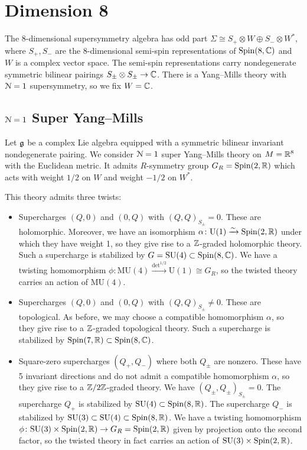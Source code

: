 \documentclass[10pt, oneside]{article}
\newcommand{\MU}{\mathrm{MU}}
\renewcommand{\U}{\mathrm{U}}
\begin{document}
\section{Dimension 8}

The 8-dimensional supersymmetry algebra has odd part $\Sigma\cong S_+\otimes W\oplus S_-\otimes W^*$, where $S_+, S_-$ are the 8-dimensional semi-spin representations of $\mathrm{Spin}(8, \mathbb C)$ and $W$ is a complex vector space. The semi-spin representations carry nondegenerate symmetric bilinear pairings $S_{\pm}\otimes S_{\pm}\rightarrow \mathbb C$. There is a Yang--Mills theory with $\mathcal{N}=1$ supersymmetry, so we fix $W = \mathbb C$.

\subsection{\texorpdfstring{$\mathcal N=1$}{N=1} Super Yang--Mills}

Let $\mathfrak g$ be a complex Lie algebra equipped with a symmetric bilinear invariant nondegenerate pairing. We consider $\mathcal N=1$ super Yang--Mills theory on $M=\mathbb R^8$ with the Euclidean metric. It admits $R$-symmetry group $G_R=\mathrm{Spin}(2, \mathbb R)$ which acts with weight $1/2$ on $W$ and weight $-1/2$ on $W^*$.

This theory admits three twists:
\begin{itemize}
\item Supercharges $(Q, 0)$ and $(0, Q)$ with $(Q, Q)_{S_\pm} = 0$. These are holomorphic. Moreover, we have an isomorphism $\alpha\colon \U(1)\xrightarrow{\sim} \Spin(2, \RR)$ under which they have weight 1, so they give rise to a $\mathbb Z$-graded holomorphic theory. Such a supercharge is stabilized by $G=\mathrm{SU}(4)\subset \mathrm{Spin}(8, \mathbb C)$. We have a twisting homomorphism $\phi\colon \MU(4)\xrightarrow{\det^{1/2}} \U(1)\cong G_R$, so the twisted theory carries an action of $\MU(4)$.

\item Supercharges $(Q, 0)$ and $(0, Q)$ with $(Q, Q)_{S_\pm}\neq 0$. These are topological. As before, we may choose a compatible homomorphism $\alpha$, so they give rise to a $\mathbb Z$-graded topological theory. Such a supercharge is stabilized by $\mathrm{Spin}(7, \mathbb R)\subset \mathrm{Spin}(8, \mathbb C)$.

\item Square-zero supercharges $(Q_+, Q_-)$ where both $Q_{\pm}$ are nonzero. These have 5 invariant directions and do not admit a compatible homomorphism $\alpha$, so they give rise to a $\mathbb Z/2\mathbb Z$-graded theory. We have $(Q_\pm, Q_\pm)_{S_\pm} = 0$. The supercharge $Q_+$ is stabilized by $\mathrm{SU}(4)\subset \mathrm{Spin}(8, \mathbb R)$. The supercharge $Q_-$ is stabilized by $\mathrm{SU}(3)\subset \mathrm{SU}(4)\subset \mathrm{Spin}(8, \mathbb R)$. We have a twisting homomorphism $\phi\colon \mathrm{SU}(3)\times \mathrm{Spin}(2, \mathbb R)\rightarrow G_R=\mathrm{Spin}(2, \mathbb R)$ given by projection onto the second factor, so the twisted theory in fact carries an action of $\mathrm{SU}(3)\times \mathrm{Spin}(2, \mathbb R)$.
\end{itemize}
\end{document}

